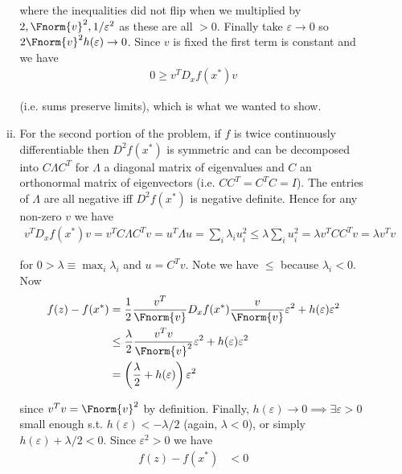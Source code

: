 \documentclass{article}
\begin{document}
\begin{enumerate}[1.]
\begin{enumerate}[a)]
\begin{enumerate}[i)]
            where the inequalities did not flip when we multiplied by $2, \Fnorm{v}^2, 1/\varepsilon^2$ as these are all $> 0$. Finally take $\varepsilon \to 0$ so $2 \Fnorm{v}^2 h(\varepsilon) \to 0$. Since $v$ is fixed the first term is constant and we have
            \begin{align*}
              0
              \ge
              v^T D_x f(x^*) v
            \end{align*}

            (i.e. sums preserve limits), which is what we wanted to show.

          \item For the second portion of the problem, if $f$ is twice continuously differentiable then $D^2f(x^*)$ is symmetric and can be decomposed into $C \Lambda C^{T}$ for $\Lambda$ a diagonal matrix of eigenvalues and $C$ an orthonormal matrix of eigenvectors (i.e. $C C^T = C^T C = I$). The entries of $\Lambda$ are all negative iff $D^2f(x^*)$ is negative definite. Hence for any non-zero $v$ we have
            \begin{align*}
              v^T D_x f(x^*) v
              =
              v^T C \Lambda C^T v
              =
              u^T \Lambda u
              =
              \sum_{i} \lambda_i u_i^2
              \le
              \lambda \sum_{i} u_i^2
              =
              \lambda v^T C C^T v
              =
              \lambda v^T v
            \end{align*}

            for $0 > \lambda \equiv \max_i \lambda_i$ and $u = C^T v$. Note we have $\le$ because $\lambda_i < 0$. Now
            \begin{align*}
              f(z) - f(x^*)
              &
              =
              \dfrac{1}{2}
              \dfrac{v^T}{\Fnorm{v}} D_x f(x^*) \dfrac{v}{\Fnorm{v}} \varepsilon^2
              +
              h(\varepsilon) \varepsilon^2
              \\
              &
              \le
              \dfrac{\lambda}{2}
              \dfrac{v^T v}{\Fnorm{v}^2} \varepsilon^2
              +
              h(\varepsilon) \varepsilon^2
              \\
              &
              =
              \left(
                \dfrac{\lambda}{2} + h(\varepsilon)
              \right) \varepsilon^2
            \end{align*}

            since $v^T v = \Fnorm{v}^2$ by definition. Finally, $h(\varepsilon) \to 0 \implies \exists \varepsilon > 0$ small enough s.t. $h(\varepsilon) < -\lambda/2$ (again, $\lambda < 0$), or simply $h(\varepsilon) + \lambda/2 < 0$. Since $\varepsilon^2 > 0$ we have
            \begin{align*}
              f(z) - f(x^*)
              &
              <
              0
            \end{align*}


\end{enumerate}
\end{enumerate}
\end{enumerate}
\end{document}
